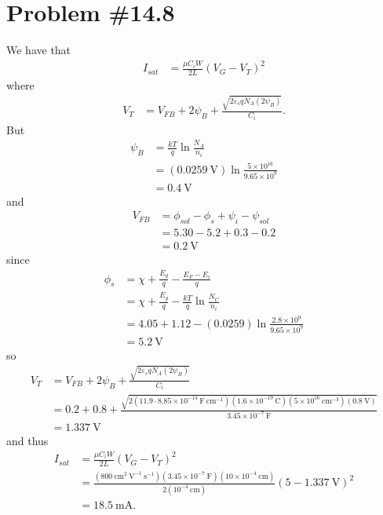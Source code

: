 \documentclass{article}
\begin{document}
\section*{Problem \#14.8}
We have that
\begin{align*}
I_{sat} &= \frac{\mu C_i W}{2L}(V_G - V_T)^2
\end{align*}
where
\begin{align*}
V_T &= V_{FB} + 2 \psi_B + \frac{\sqrt{2\varepsilon_s q N_A (2 \psi_B)}}{C_i}.
\end{align*}
But
\begin{align*}
\psi_B &= \frac{kT}{q} \ln \frac{N_A}{n_i} \\
       &= (0.0259 ~\mathrm{V})
          \ln \frac{5 \times 10^{16}}{9.65 \times 10^9} \\
       &= 0.4 ~\mathrm{V}
\end{align*}
and
\begin{align*}
V_{FB} &= \phi_{sol} - \phi_s + \psi_i - \psi_{sol} \\
       &= 5.30       - 5.2    + 0.3    - 0.2 \\
       &= 0.2 ~\mathrm{V}
\end{align*}
since
\begin{align*}
\phi_s &= \chi + \frac{E_g}{q} - \frac{E_F - E_i}{q} \\
       &= \chi + \frac{E_g}{q} - \frac{kT}{q} \ln \frac{N_C}{n_i} \\
       &= 4.05 + 1.12 - (0.0259) \ln \frac{2.8 \times 10^9}{9.65 \times 10^9} \\
       &= 5.2 ~\mathrm{V} 
\end{align*}
so
\begin{align*}
V_T &= V_{FB} + 2 \psi_B + \frac{\sqrt{2\varepsilon_s q N_A (2 \psi_B)}}{C_i} \\
    &= 0.2 + 0.8 + \frac{\sqrt{2(11.9 \cdot 8.85 \times 10^{-14} ~\mathrm{F}~\mathrm{cm}^{-1})
                                (1.6 \times 10^{-19} ~\mathrm{C})
                                (5 \times 10^{16} ~\mathrm{cm}^{-3})
                                (0.8 ~\mathrm{V})}}
                        {3.45 \times 10^{-7} ~\mathrm{F}} \\
    &= 1.337 ~\mathrm{V}
\end{align*}
and thus
\begin{align*}
I_{sat} &= \frac{\mu C_i W}{2L}(V_G - V_T)^2 \\
        &= \frac{(800 ~\mathrm{cm}^2 ~\mathrm{V}^{-1} ~\mathrm{s}^{-1})
                 (3.45 \times 10^{-7} ~\mathrm{F})
                 (10 \times 10^{-4}~\mathrm{cm})
                }
                {2(10^{-4} ~\mathrm{cm})}
           (5 - 1.337~\mathrm{V})^2 \\
         &= 18.5 ~\mathrm{mA}.
\end{align*}
\end{document}
